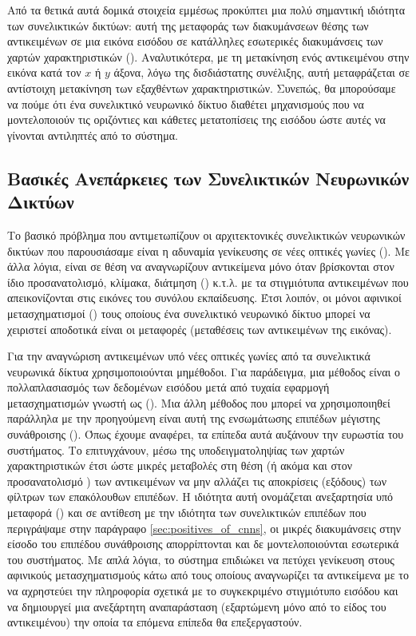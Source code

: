 Από τα θετικά αυτά δομικά στοιχεία εμμέσως προκύπτει μια πολύ σημαντική ιδιότητα των συνελικτικών δικτύων: αυτή της μεταφοράς των διακυμάνσεων θέσης των αντικειμένων σε μια εικόνα εισόδου σε κατάλληλες εσωτερικές διακυμάνσεις των χαρτών χαρακτηριστικών (). Αναλυτικότερα, με τη μετακίνηση ενός αντικειμένου στην εικόνα κατά τον $x$ ή $y$ άξονα, λόγω της δισδιάστατης συνέλιξης, αυτή μεταφράζεται σε αντίστοιχη μετακίνηση των εξαχθέντων χαρακτηριστικών. Συνεπώς, θα μπορούσαμε να πούμε ότι ένα συνελικτικό νευρωνικό δίκτυο διαθέτει μηχανισμούς που να μοντελοποιούν τις οριζόντιες και κάθετες μετατοπίσεις της εισόδου ώστε αυτές να γίνονται αντιληπτές από το σύστημα.

\subsection{Βασικές Ανεπάρκειες των Συνελικτικών Νευρωνικών Δικτύων}
Το βασικό πρόβλημα που αντιμετωπίζουν οι αρχιτεκτονικές συνελικτικών νευρωνικών δικτύων που παρουσιάσαμε είναι η αδυναμία γενίκευσης σε νέες οπτικές γωνίες (). Με άλλα λόγια, είναι σε θέση να αναγνωρίζουν αντικείμενα μόνο όταν βρίσκονται στον ίδιο προσανατολισμό, κλίμακα, διάτμηση () κ.τ.λ. με τα στιγμιότυπα αντικειμένων που απεικονίζονται στις εικόνες του συνόλου εκπαίδευσης. Έτσι λοιπόν, οι μόνοι αφινικοί μετασχηματισμοί () τους οποίους ένα συνελικτικό νευρωνικό δίκτυο μπορεί να χειριστεί αποδοτικά είναι οι μεταφορές (μεταθέσεις των αντικειμένων της εικόνας)\cite{sabour2017dynamic}.\par

Για την αναγνώριση αντικειμένων υπό νέες οπτικές γωνίες από τα συνελικτικά νευρωνικά δίκτυα χρησιμοποιούνται μη μέθοδοι. Για παράδειγμα, μια μέθοδος είναι ο πολλαπλασιασμός των δεδομένων εισόδου μετά από τυχαία εφαρμογή μετασχηματισμών γνωστή ως  (). Μια άλλη μέθοδος που μπορεί να χρη\-σι\-μο\-ποιη\-θεί παράλληλα με την προηγούμενη είναι αυτή της ενσωμάτωσης επιπέδων μέγιστης συνάθροισης (). Όπως έχουμε αναφέρει, τα επίπεδα αυτά αυξάνουν την ευρωστία του συστήματος. Το επιτυγχάνουν, μέσω της υποδειγματοληψίας των χαρτών χαρακτηριστικών έτσι ώστε μικρές μεταβολές στη θέση (ή ακόμα και στον προσανατολισμό \cite{geron2019hands}) των αντικειμένων να μην αλλάζει τις αποκρίσεις (εξόδους) των φίλτρων των επακόλουθων επιπέδων. Η ιδιότητα αυτή ονομάζεται ανεξαρτησία υπό μεταφορά () και σε αντίθεση με την ιδιότητα των συνελικτικών επιπέδων που περιγράψαμε στην παράγραφο \ref{sec:positives_of_cnns}, οι μικρές διακυμάνσεις στην είσοδο του επιπέδου συνάθροισης απορρίπτονται και δε μοντελοποιούνται εσωτερικά του συστήματος. Με απλά λόγια, το σύστημα επιδιώκει να πετύχει γενίκευση στους αφινικούς μετασχηματισμούς κάτω από τους οποίους αναγνωρίζει τα αντικείμενα με το να αχρηστεύει την πληροφορία σχετικά με το συγκεκριμένο στιγμιότυπο εισόδου και να δημιουργεί μια ανεξάρτητη αναπαράσταση (εξαρτώμενη μόνο από το είδος του αντικειμένου) την οποία τα επόμενα επίπεδα θα επεξεργαστούν.\par

